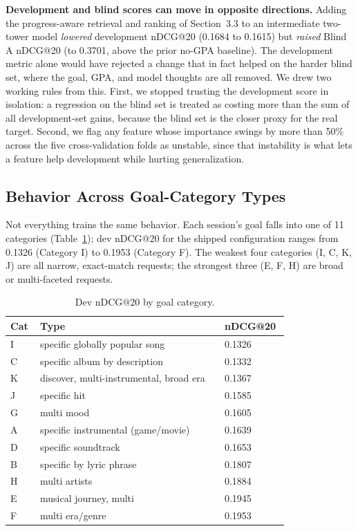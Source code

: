 \documentclass[sigconf]{acmart}
\begin{document}
\textbf{Development and blind scores can move in opposite directions.} Adding
the progress-aware retrieval and ranking of Section~3.3 to an intermediate
two-tower model \emph{lowered} development nDCG@20 (0.1684 to 0.1615) but
\emph{raised} Blind A nDCG@20 (to 0.3701, above the prior no-GPA baseline).
The development metric alone would have rejected a change that in fact helped
on the harder blind set, where the goal, GPA, and model thoughts are all
removed. We drew two working rules from this. First, we stopped trusting the
development score in isolation: a regression on the blind set is treated as
costing more than the sum of all development-set gains, because the blind set
is the closer proxy for the real target. Second, we flag any feature whose
importance swings by more than 50\% across the five cross-validation folds as
unstable, since that instability is what lets a feature help development while
hurting generalization.

\subsection{Behavior Across Goal-Category Types}

Not everything trains the same behavior. Each session's goal falls into one
of 11 categories (Table~\ref{tab:goalcat}); dev nDCG@20 for the shipped
configuration ranges from 0.1326 (Category I) to 0.1953 (Category F). The
weakest four categories (I, C, K, J) are all narrow, exact-match requests;
the strongest three (E, F, H) are broad or multi-faceted requests.

\begin{table}
  \caption{Dev nDCG@20 by goal category.}
  \label{tab:goalcat}
  \begin{tabular}{p{0.08\linewidth}p{0.6\linewidth}p{0.12\linewidth}}
    \toprule
    \textbf{Cat} & \textbf{Type} & \textbf{nDCG@20} \\
    \midrule
    I & specific globally popular song & 0.1326 \\
    C & specific album by description & 0.1332 \\
    K & discover, multi-instrumental, broad era & 0.1367 \\
    J & specific hit & 0.1585 \\
    G & multi mood & 0.1605 \\
    A & specific instrumental (game/movie) & 0.1639 \\
    D & specific soundtrack & 0.1653 \\
    B & specific by lyric phrase & 0.1807 \\
    H & multi artists & 0.1884 \\
    E & musical journey, multi & 0.1945 \\
    F & multi era/genre & 0.1953 \\
    \bottomrule
  \end{tabular}
\end{table}
\end{document}

